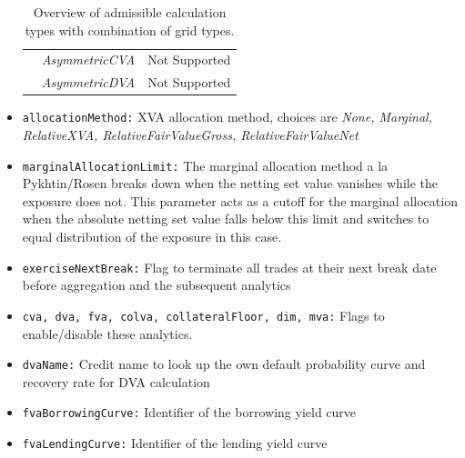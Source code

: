 \documentclass[12pt, a4paper]{article}
\begin{document}
\begin{itemize}
\begin{table}[!h]
\begin{tabular}{!{\color{black}\vrule}c!{\color{black}\vrule}c!{\color{black}\vrule}l!{\color{black}\vrule}}
                                                                          & {\em AsymmetricCVA}                                              & Not Supported                                                                                                                                                                                     \\ 
                                                                          & {\em AsymmetricDVA}                                              & Not Supported                                                                                                                                                                                     \\
\hline
\end{tabular}
\caption{Overview of admissible calculation types with combination of grid types.} \label{tab:calcTypes}
\end{table}
%
\item {\tt allocationMethod:} XVA allocation method, choices are {\em None, Marginal, RelativeXVA, RelativeFairValueGross, RelativeFairValueNet}
\item {\tt marginalAllocationLimit:} The marginal allocation method a la Pykhtin/Rosen breaks down when the netting set
value vanishes while the exposure does not. This parameter acts as a cutoff for the marginal allocation when the
absolute netting set value falls below this limit and switches to equal distribution of the exposure in this case.
\item {\tt exerciseNextBreak:} Flag to terminate all trades at their next break date before aggregation and the
subsequent analytics
\item {\tt cva, dva, fva, colva, collateralFloor, dim, mva:} Flags to enable/disable these analytics. 
\item {\tt dvaName:} Credit name to look up the own default probability curve and recovery rate for DVA calculation
\item {\tt fvaBorrowingCurve:} Identifier of the borrowing yield curve
\item {\tt fvaLendingCurve:} Identifier of the lending yield curve

\end{itemize}
\end{document}
